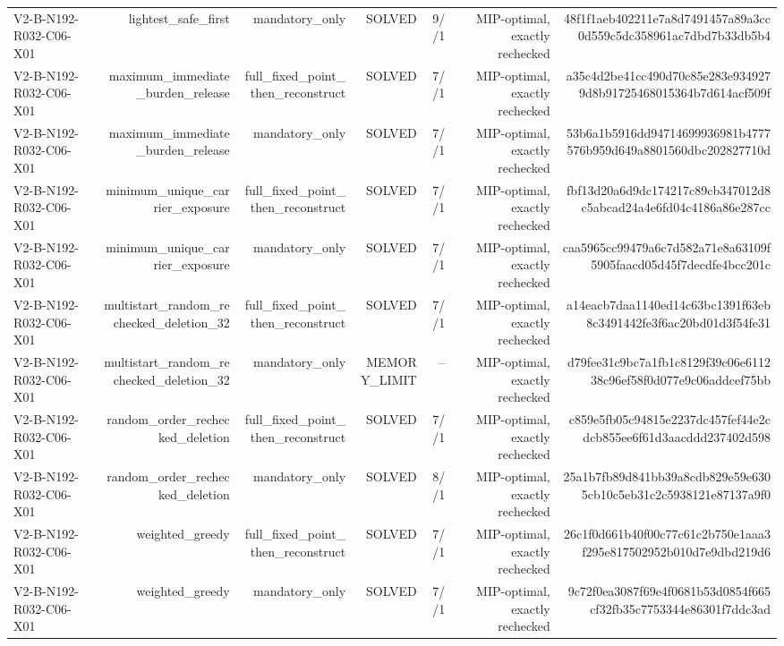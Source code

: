 {\begin{longtable}{lrrrrrr}
V2-B-N192-R032-C06-X01 & lightest\_safe\_first & mandatory\_only & SOLVED & 9//1 & MIP-optimal, exactly rechecked & 48f1f1aeb402211e7a8d7491457a89a3cc0d559c5dc358961ac7dbd7b33db5b4 \\
V2-B-N192-R032-C06-X01 & maximum\_immediate\_burden\_release & full\_fixed\_point\_then\_reconstruct & SOLVED & 7//1 & MIP-optimal, exactly rechecked & a35c4d2be41cc490d70c85e283e9349279d8b91725468015364b7d614acf509f \\
V2-B-N192-R032-C06-X01 & maximum\_immediate\_burden\_release & mandatory\_only & SOLVED & 7//1 & MIP-optimal, exactly rechecked & 53b6a1b5916dd94714699936981b4777576b959d649a8801560dbc202827710d \\
V2-B-N192-R032-C06-X01 & minimum\_unique\_carrier\_exposure & full\_fixed\_point\_then\_reconstruct & SOLVED & 7//1 & MIP-optimal, exactly rechecked & fbf13d20a6d9dc174217c89cb347012d8c5abcad24a4e6fd04c4186a86e287cc \\
V2-B-N192-R032-C06-X01 & minimum\_unique\_carrier\_exposure & mandatory\_only & SOLVED & 7//1 & MIP-optimal, exactly rechecked & caa5965cc99479a6c7d582a71e8a63109f5905faacd05d45f7decdfe4bcc201c \\
V2-B-N192-R032-C06-X01 & multistart\_random\_rechecked\_deletion\_32 & full\_fixed\_point\_then\_reconstruct & SOLVED & 7//1 & MIP-optimal, exactly rechecked & a14eacb7daa1140ed14c63bc1391f63eb8c3491442fe3f6ac20bd01d3f54fe31 \\
V2-B-N192-R032-C06-X01 & multistart\_random\_rechecked\_deletion\_32 & mandatory\_only & MEMORY\_LIMIT & -- & MIP-optimal, exactly rechecked & d79fee31c9bc7a1fb1c8129f39c06e611238c96ef58f0d077e9c06addcef75bb \\
V2-B-N192-R032-C06-X01 & random\_order\_rechecked\_deletion & full\_fixed\_point\_then\_reconstruct & SOLVED & 7//1 & MIP-optimal, exactly rechecked & c859e5fb05c94815e2237dc457fef44e2cdcb855ee6f61d3aacddd237402d598 \\
V2-B-N192-R032-C06-X01 & random\_order\_rechecked\_deletion & mandatory\_only & SOLVED & 8//1 & MIP-optimal, exactly rechecked & 25a1b7fb89d841bb39a8cdb829e59e6305cb10c5eb31c2c5938121e87137a9f0 \\
V2-B-N192-R032-C06-X01 & weighted\_greedy & full\_fixed\_point\_then\_reconstruct & SOLVED & 7//1 & MIP-optimal, exactly rechecked & 26c1f0d661b40f00c77c61c2b750e1aaa3f295e817502952b010d7e9dbd219d6 \\
V2-B-N192-R032-C06-X01 & weighted\_greedy & mandatory\_only & SOLVED & 7//1 & MIP-optimal, exactly rechecked & 9c72f0ea3087f69e4f0681b53d0854f665cf32fb35c7753344e86301f7ddc3ad \\

\end{longtable}}
